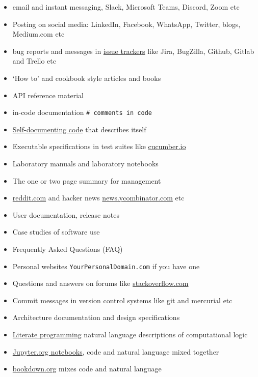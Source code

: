 \documentclass[
]{book}
\providecommand{\tightlist}{%
  \setlength{\itemsep}{0pt}\setlength{\parskip}{0pt}}
\begin{document}
\begin{itemize}
\tightlist
\item
  email and instant messaging, Slack, Microsoft Teams, Discord, Zoom etc
\item
  Posting on social media: LinkedIn, Facebook, WhatsApp, Twitter, blogs, Medium.com etc
\item
  bug reports and messages in \href{https://en.wikipedia.org/wiki/Comparison_of_issue-tracking_systems}{issue trackers} like Jira, BugZilla, Github, Gitlab and Trello etc
\item
  `How to' and cookbook style articles and books
\item
  API reference material
\item
  in-code documentation \texttt{\#\ comments\ in\ code}
\item
  \href{https://en.wikipedia.org/wiki/Self-documenting_code}{Self-documenting code} that describes itself
\item
  Executable specifications in test suites like \href{https://en.wikipedia.org/wiki/Cucumber_(software)}{cucumber.io}
\item
  Laboratory manuals and laboratory notebooks
\item
  The one or two page summary for management
\item
  \href{https://www.reddit.com/}{reddit.com} and hacker news \href{https://news.ycombinator.com/}{news.ycombinator.com} etc
\item
  User documentation, release notes
\item
  Case studies of software use
\item
  Frequently Asked Questions (FAQ)
\item
  Personal websites \texttt{YourPersonalDomain.com} if you have one
\item
  Questions and answers on forums like \href{https://stackoverflow.com/}{stackoverflow.com}
\item
  Commit messages in version control systems like git and mercurial etc
\item
  Architecture documentation and design specifications
\item
  \href{https://en.wikipedia.org/wiki/Literate_programming}{Literate programming} natural language descriptions of computational logic \citep{knuthlit}
\item
  \href{https://jupyter.org/}{Jupyter.org notebooks}, code and natural language mixed together
\item
  \href{https://bookdown.org/}{bookdown.org} mixes code and natural language
\end{itemize}
\end{document}

